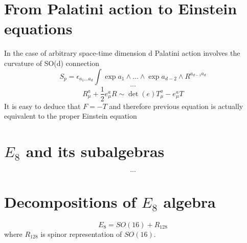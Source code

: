 \documentclass{article}
\begin{document}
\section{From Palatini action to Einstein equations}
In the case of arbitrary space-time dimension d Palatini action involves the curvature of SO(d) connection
\begin{equation}
    S_p = \epsilon_{a_1 ... a_d} \int \exp{a_1} \land ... \land \exp{a_{d-2}} \land R^{a_{d-1}a_d}
\end{equation}
\begin{equation}
    ...
\end{equation}
\begin{equation}
    R_\mu^a + \frac{1}{2}e_\mu^a R \sim \det(e)T_\mu^a - e^a_\mu T
\end{equation}
It is easy to deduce that $F = -T$ and therefore previous equation is actually equivalent to the proper Einstein equation

\section{$E_8$ and its subalgebras}
\begin{equation}
    ...
\end{equation}

\section{Decompositions of $E_8$ algebra}
\begin{equation}
    E_8 = SO(16) + R_{128}
\end{equation}
where $R_{128}$ is spinor representation of $SO(16)$.
\end{document}
